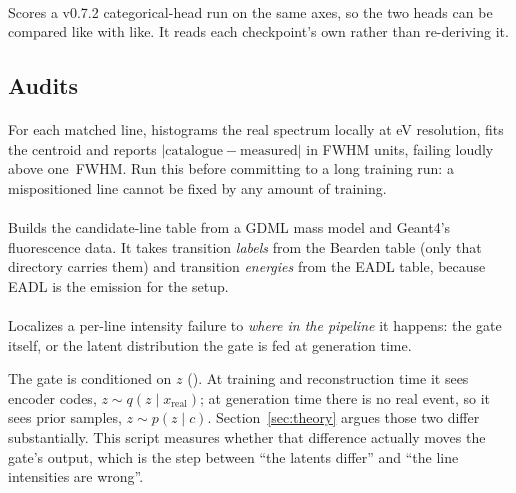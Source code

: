 \documentclass[11pt,a4paper]{article}
\begin{document}
\paragraph{} Scores a v0.7.2 categorical-head run on
the same axes, so the two heads can be compared like with like. It reads each
checkpoint's own  rather than re-deriving it.

\subsection{Audits}

\paragraph{} For each matched line, histograms
the real spectrum locally at eV resolution, fits the centroid and reports
$|\text{catalogue} - \text{measured}|$ in FWHM units, failing loudly above
one~FWHM. Run this before committing to a long training run: a mispositioned
line cannot be fixed by any amount of training.

\paragraph{} Builds the
candidate-line table from a GDML mass model and Geant4's fluorescence data. It
takes transition \emph{labels} from the Bearden table (only that directory
carries them) and transition \emph{energies} from the EADL table, because EADL
is the emission for the  setup.

\paragraph{} Localizes a per-line
intensity failure to \emph{where in the pipeline} it happens: the gate itself,
or the latent distribution the gate is fed at generation time.

The gate is conditioned on $z$ (). At
training and reconstruction time it sees encoder codes,
$z \sim q(z \mid x_{\text{real}})$; at generation time there is no real event,
so it sees prior samples, $z \sim p(z \mid c)$. Section~\ref{sec:theory} argues
those two differ substantially. This script measures whether that difference
actually moves the gate's output, which is the step between ``the latents
differ'' and ``the line intensities are wrong''.
\end{document}
